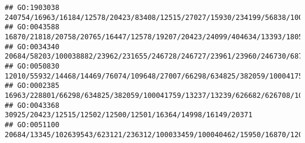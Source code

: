 \documentclass[
]{article}
\begin{document}
\begin{verbatim}
## GO:1903038                                                                                                                                                                                                                                                                                           240754/16963/16184/12578/20423/83408/12515/27027/15930/234199/56838/100043314/208154/14960/16149/60533/58205/20371
## GO:0043588                                                                                                                                                                                                                              16870/21818/20758/20765/16447/12578/19207/20423/24099/404634/13393/18053/16664/16666/17702/14165/29820/22337/16688/16682/268885/433016/20861/100034684/20862/16994/494504/14419
## GO:0034340                                                                                                                                                                                                                                                                                                                 20684/58203/100038882/23962/231655/246728/246727/23961/23960/246730/68713/54123/434341/17858
## GO:0050830                                                                                                                                                                                                                                                                              12010/55932/14468/14469/76074/109648/27007/66298/634825/382059/100041759/13237/13239/626682/626708/100041952/503491/78416/57757
## GO:0002385                                                                                                                                                                                                                                                                                                                  16963/228801/66298/634825/382059/100041759/13237/13239/626682/626708/100041952/503491/11808
## GO:0043368                                                                                                                                                                                                                                                                                                                                                  30925/20423/12515/12502/12500/12501/16364/14998/16149/20371
## GO:0051100                                                                                                                                                                                                                                                                                          20684/13345/102639543/623121/236312/100033459/100040462/15950/16870/12010/20568/12578/20423/15110/20666/17702/15958

\end{verbatim}
\end{document}
